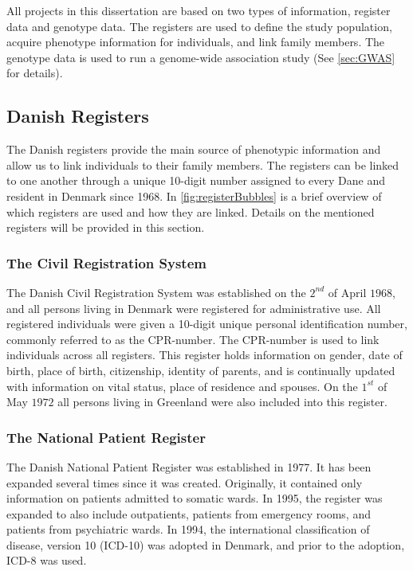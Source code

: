All projects in this dissertation are based on two types of information, register data and genotype data. The registers are used to define the study population, acquire phenotype information for individuals, and link family members. The genotype data is used to run a genome-wide association study (See \cref{sec:GWAS} for details). 

\subsection{Danish Registers}
The Danish registers provide the main source of phenotypic information and allow us to link individuals to their family members. The registers can be linked to one another through a unique 10-digit number assigned to every Dane and resident in Denmark since 1968. In \cref{fig:registerBubbles} is a brief overview of which registers are used and how they are linked. Details on the mentioned registers will be provided in this section.


\subsubsection{The Civil Registration System}
The Danish Civil Registration System was established on the $ 2^{nd} $ of April $ 1968 $, and all persons living in Denmark were registered for administrative use. All registered individuals were given a 10-digit unique personal identification number, commonly referred to as the CPR-number. The CPR-number is used to link individuals across all registers. This register holds information on gender, date of birth, place of birth, citizenship, identity of parents, and is continually updated with information on vital status, place of residence and spouses. On the $ 1^{st} $ of May $ 1972  $ all persons living in Greenland were also included into this register\cite{pedersen2011danish}. 

\subsubsection{The National Patient Register}
The Danish National Patient Register was established in 1977. It has been expanded several times since it was created. Originally, it contained only information on patients admitted to somatic wards. In 1995, the register was expanded to also include outpatients, patients from emergency rooms, and patients from psychiatric wards. In 1994, the international classification of disease, version 10 (ICD-10) was adopted in Denmark, and prior to the adoption, ICD-8 was used\cite{lynge2011danish}. 


